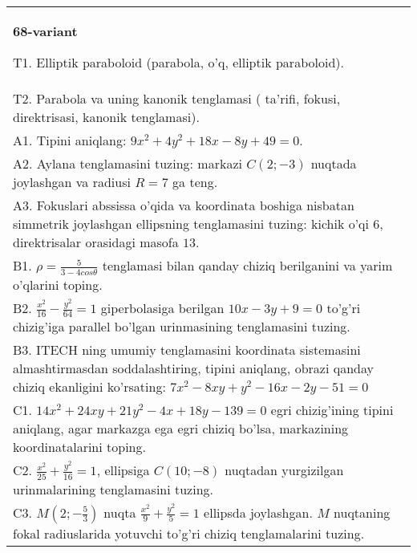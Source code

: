 \documentclass{article}
\begin{document}
\begin{tabular}{m{17cm}}
\textbf{68-variant}
\newline

T1. Elliptik paraboloid (parabola, o'q, elliptik paraboloid).\\

T2. Parabola va uning kanonik tenglamasi ( ta'rifi, fokusi, direktrisasi, kanonik tenglamasi).\\

A1. Tipini aniqlang: $9x^{2}+4y^{2}+18x-8y+49=0$.\\

A2. Aylana tenglamasini tuzing: markazi $C(2;-3)$ nuqtada joylashgan va radiusi $R=7$ ga teng.\\

A3. Fokuslari abssissa o'qida va koordinata boshiga nisbatan simmetrik joylashgan ellipsning tenglamasini tuzing: kichik o'qi $6$, direktrisalar orasidagi masofa $13$.\\

B1. $\rho = \frac{5}{3 - 4cos\theta}$ tenglamasi bilan qanday chiziq berilganini va yarim o'qlarini toping.  \\

B2. $\frac{x^{2}}{16} - \frac{y^{2}}{64} = 1$ giperbolasiga berilgan $10x - 3y + 9 = 0$ to'g'ri chizig'iga parallel bo'lgan urinmasining tenglamasini tuzing.  \\

B3. ITECH ning umumiy tenglamasini koordinata sistemasini almashtirmasdan soddalashtiring, tipini aniqlang, obrazi qanday chiziq ekanligini ko'rsating: $7x^{2} - 8xy + y^{2} - 16x - 2y - 51 = 0$\\

C1. $14x^{2} + 24xy + 21y^{2} - 4x + 18y - 139 = 0$ egri chizig'ining tipini aniqlang, agar markazga ega egri chiziq bo'lsa, markazining koordinatalarini toping.  \\

C2. $\frac{x^{2}}{25} + \frac{y^{2}}{16} = 1$, ellipsiga $C(10; - 8)$ nuqtadan yurgizilgan urinmalarining tenglamasini tuzing.  \\

C3. $M(2; - \frac{5}{3})$ nuqta $\frac{x^{2}}{9} + \frac{y^{2}}{5} = 1$ ellipsda joylashgan. $M$ nuqtaning fokal radiuslarida yotuvchi to'g'ri chiziq tenglamalarini tuzing.  \\

\end{tabular}
\vspace{1cm}
\end{document}
